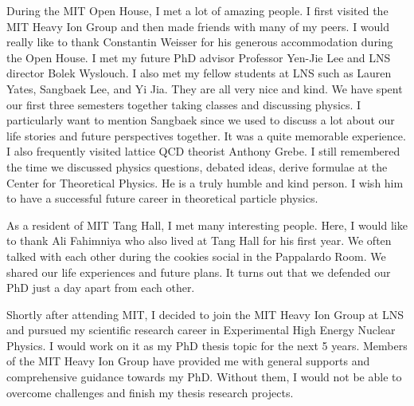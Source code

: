 During the MIT Open House, I met a lot of amazing people. I first visited the MIT Heavy Ion Group and then made friends with many of my peers. I would really like to thank Constantin Weisser for his generous accommodation during the Open House. I met my future PhD advisor Professor Yen-Jie Lee and LNS director Bolek Wyslouch. I also met my fellow students at LNS such as Lauren Yates, Sangbaek Lee, and Yi Jia. They are all very nice and kind. We have spent our first three semesters together taking classes and discussing physics. I particularly want to mention Sangbaek since we used to discuss a lot about our life stories and future perspectives together. It was a quite memorable experience. I also frequently visited lattice QCD theorist Anthony Grebe. I still remembered the time we discussed physics questions, debated ideas, derive formulae at the Center for Theoretical Physics. He is a truly humble and kind person. I wish him to have a successful future career in theoretical particle physics.


As a resident of MIT Tang Hall, I met many interesting people. Here, I would like to thank Ali Fahimniya who also lived at Tang Hall for his first year. We often talked with each other during the cookies social in the Pappalardo Room. We shared our life experiences and future plans. It turns out that we defended our PhD just a day apart from each other. 

Shortly after attending MIT, I decided to join the MIT Heavy Ion Group at LNS and pursued my scientific research career in Experimental High Energy Nuclear Physics. I would work on it as my PhD thesis topic for the next 5 years. Members of the MIT Heavy Ion Group have provided me with general supports and comprehensive guidance towards my PhD. Without them, I would not be able to overcome challenges and finish my thesis research projects. 


